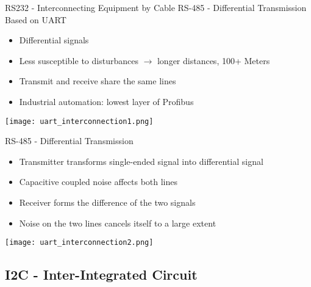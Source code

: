 \begin{concept}{RS232 - Interconnecting Equipment by Cable}
    RS-485 - Differential Transmission Based on UART
    \begin{itemize}
        \item Differential signals 
        \item Less susceptible to disturbances $\rightarrow$ longer distances, 100+ Meters
        \item Transmit and receive share the same lines
        \item Industrial automation: lowest layer of Profibus
    \end{itemize}
    \begin{center}
    \texttt{[image: uart\_interconnection1.png]}
    \end{center}
\end{concept}

\begin{theorem}
    {RS-485 - Differential Transmission}
    \begin{itemize}
        \item Transmitter transforms single-ended signal into differential signal
        \item Capacitive coupled noise affects both lines
        \item Receiver forms the difference of the two signals
        \item Noise on the two lines cancels itself to a large extent
    \end{itemize}
    \begin{center}
    \texttt{[image: uart\_interconnection2.png]}
    \end{center}
\end{theorem}


\raggedcolumns
\pagebreak






\subsection{I2C - Inter-Integrated Circuit}





